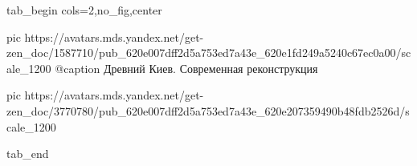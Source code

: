  
 
 
 
 


\ifcmt
  tab_begin cols=2,no_fig,center

     pic https://avatars.mds.yandex.net/get-zen_doc/1587710/pub_620e007dff2d5a753ed7a43e_620e1fd249a5240c67ec0a00/scale_1200
		 @caption Древний Киев. Современная реконструкция

		 pic https://avatars.mds.yandex.net/get-zen_doc/3770780/pub_620e007dff2d5a753ed7a43e_620e207359490b48fdb2526d/scale_1200

  tab_end
\fi
